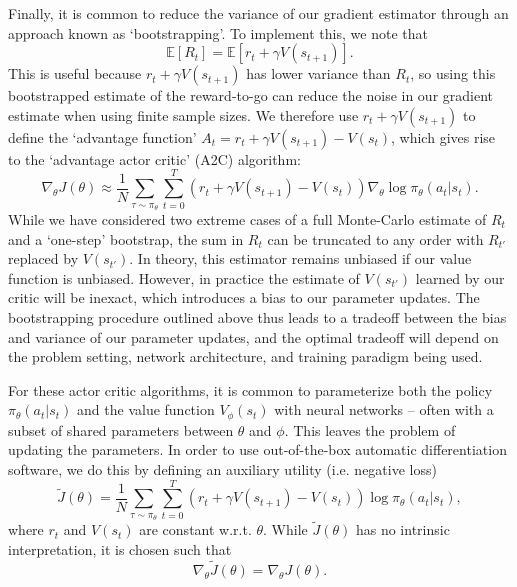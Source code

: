 Finally, it is common to reduce the variance of our gradient estimator through an approach known as `bootstrapping'.
To implement this, we note that
\begin{equation}
    \mathbb{E} \left [ R_t \right ] = \mathbb{E}[r_t + \gamma V(s_{t+1})].
\end{equation}
This is useful because $r_t + \gamma V(s_{t+1})$ has lower variance than $R_t$, so using this bootstrapped estimate of the reward-to-go can reduce the noise in our gradient estimate when using finite sample sizes.
We therefore use $r_t + \gamma V(s_{t+1})$ to define the `advantage function' $A_t = r_t + \gamma V(s_{t+1}) - V(s_t)$, which gives rise to the `advantage actor critic' (A2C) algorithm:
\begin{equation}
    \nabla_\theta J(\theta) \approx \frac{1}{N} \sum_{\tau \sim \pi_\theta}  \sum_{t=0}^T (r_t + \gamma V(s_{t+1}) - V(s_t)) \nabla_\theta \log \pi_\theta (a_t|s_t).
\end{equation}
While we have considered two extreme cases of a full Monte-Carlo estimate of $R_t$ and a `one-step' bootstrap, the sum in $R_t$ can be truncated to any order with $R_{t'}$ replaced by $V(s_{t'})$.
In theory, this estimator remains unbiased if our value function is unbiased.
However, in practice the estimate of $V(s_{t'})$ learned by our critic will be inexact, which introduces a bias to our parameter updates.
The bootstrapping procedure outlined above thus leads to a tradeoff between the bias and variance of our parameter updates, and the optimal tradeoff will depend on the problem setting, network architecture, and training paradigm being used.

For these actor critic algorithms, it is common to parameterize both the policy $\pi_\theta(a_t|s_t)$ and the value function $V_\phi(s_t)$ with neural networks -- often with a subset of shared parameters between $\theta$ and $\phi$.
This leaves the problem of updating the parameters.
In order to use out-of-the-box automatic differentiation software, we do this by defining an auxiliary utility (i.e. negative loss)
\begin{equation}
    \tilde{J}(\theta) = \frac{1}{N} \sum_{\tau \sim \pi_\theta}  \sum_{t=0}^T (r_t + \gamma V(s_{t+1}) - V(s_t)) \log \pi_\theta (a_t|s_t),
\end{equation}
where $r_t$ and $V(s_t)$ are constant w.r.t. $\theta$.
While $\tilde{J}(\theta)$ has no intrinsic interpretation, it is chosen such that
\begin{equation}
    \nabla_\theta \tilde{J}(\theta) = \nabla_\theta J(\theta).
\end{equation}

